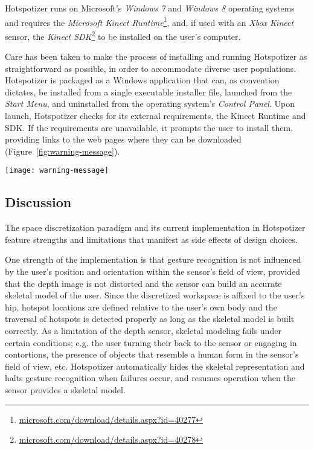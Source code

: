 Hotspotizer runs on Microsoft's \emph{Windows 7} and \emph{Windows 8} operating systems and requires the \emph{Microsoft Kinect Runtime}\footnote{\href{http://www.microsoft.com/en-us/download/details.aspx?id=40277}{microsoft.com/download/details.aspx?id=40277}}, and, if used with an \emph{Xbox Kinect} sensor, the \emph{Kinect SDK}\footnote{\href{http://www.microsoft.com/en-us/download/details.aspx?id=40278}{microsoft.com/download/details.aspx?id=40278}} to be installed on the user's computer.

Care has been taken to make the process of installing and running Hotspotizer as straightforward as possible, in order to accommodate diverse user populations. Hotspotizer is packaged as a Windows application that can, as convention dictates, be installed from a single executable installer file, launched from the \emph{Start Menu}, and uninstalled from the operating system's \emph{Control Panel}. Upon launch, Hotspotizer checks for its external requirements, the Kinect Runtime and SDK. If the requirements are unavailable, it prompts the user to install them, providing links to the web pages where they can be downloaded (Figure~\ref{fig:warning-message}).

\begin{SCfigure}[3][t]
\centering
\texttt{[image: warning-message]}
\caption{If the Kinect sensor is not functioning properly or if pre-requisite software is not installed on the computer, Hotspotizer prompts the user with a warning message.}
\label{fig:warning-message}
\end{SCfigure}

\subsection{Discussion}

The space discretization paradigm and its current implementation in Hotspotizer feature strengths and limitations that manifest as side effects of design choices.

One strength of the implementation is that gesture recognition is not influenced by the user's position and orientation within the sensor's field of view, provided that the depth image is not distorted and the sensor can build an accurate skeletal model of the user. Since the discretized workspace is affixed to the user's hip, hotspot locations are defined relative to the user's own body and the traversal of hotspots is detected properly as long as the skeletal model is built correctly. As a limitation of the depth sensor, skeletal modeling fails under certain conditions; e.g. the user turning their back to the sensor or engaging in contortions, the presence of objects that resemble a human form in the sensor's field of view, etc. Hotspotizer automatically hides the skeletal representation and halts gesture recognition when failures occur, and resumes operation when the sensor provides a skeletal model.

